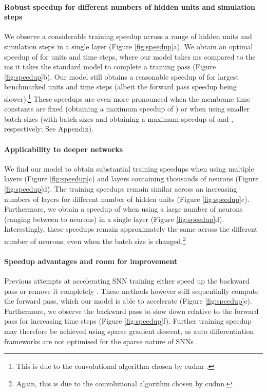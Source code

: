 \documentclass{article} \usepackage{iclr2023_conference,times}
\begin{document}
\paragraph{Robust speedup for different numbers of hidden units and simulation steps} We observe a considerable training speedup across a range of hidden units and simulation steps in a single layer (Figure \ref{fig:speedup}a). We obtain an optimal speedup of  for  units and  time steps, where our model takes ms compared to the ms it takes the standard model to complete a training pass (Figure \ref{fig:speedup}b). Our model still obtains a reasonable speedup of  for largest benchmarked  units and  time steps (albeit the forward pass speedup being slower).\footnote{This is due to the convolutional algorithm chosen by cudnn \citep{chetlur2014cudnn}.} These speedups are even more pronounced when the membrane time constants are fixed (obtaining a maximum speedup of ) or when using smaller batch sizes (with batch sizes  and  obtaining a maximum speedup of  and , respectively; See Appendix).

\paragraph{Applicability to deeper networks} We find our model to obtain substantial training speedups when using multiple layers (Figure \ref{fig:speedup}c) and layers containing thousands of neurons (Figure \ref{fig:speedup}d). The training speedups remain similar across an increasing numbers of layers for different number of hidden units (Figure \ref{fig:speedup}c). Furthermore, we obtain a speedup of  when using a large number of neurons (ranging between  to  neurons) in a single layer (Figure \ref{fig:speedup}d). Interestingly, these speedups remain approximately the same across the different number of neurons, even when the batch size is changed.\footnote{Again, this is due to the convolutional algorithm chosen by cudnn.}
	
\paragraph{Speedup advantages and room for improvement} Previous attempts at accelerating SNN training either speed up the backward pass \citep{perez2021sparse} or remove it completely \citep{bellec2020solution}. These methods however still sequentially compute the forward pass, which our model is able to accelerate (Figure \ref{fig:speedup}e). Furthermore, we observe the backward pass to slow down relative to the forward pass for increasing time steps (Figure \ref{fig:speedup}f). Further training speedup may therefore be achieved using sparse gradient descent, as auto differentiation frameworks are not optimised for the sparse nature of SNNs \citep{perez2021sparse}.
\end{document}
